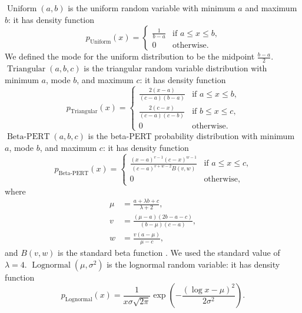 \documentclass[11pt]{article}
\DeclareMathOperator{\Uniform}{Uniform}
\DeclareMathOperator{\Triangular}{Triangular}
\DeclareMathOperator{\Lognormal}{Lognormal}
\DeclareMathOperator{\BetaPERT}{Beta-PERT}
\begin{document}
$\Uniform(a, b)$ is the uniform random variable with minimum $a$
and maximum $b$: it has density function
\begin{equation}
  \label{uniform}
  p_{\Uniform}(x) =
  \begin{cases}
    \frac{1}{b - a} & \text{if $a \leq x \leq b$,}
    \\
    0 & \text{otherwise.}
  \end{cases}
\end{equation}
We defined the mode for the uniform distribution to be the midpoint
$\frac{b - a}{2}$.
%
$\Triangular(a, b, c)$ is the triangular random variable
distribution with minimum $a$, mode $b$, and maximum $c$: it has
density function
\begin{equation}
  \label{triangular}
  p_{\Triangular}(x) =
  \begin{cases}
    \frac{2 (x - a)}{(c - a)(b - a)} & \text{if $a \leq x \leq b$,}
    \\
    \frac{2 (c - x)}{(c - a)(c - b)} & \text{if $b \leq x \leq c$,}
    \\
    0 & \text{otherwise.}
  \end{cases}
\end{equation}
$\BetaPERT(a, b, c)$ is the beta-PERT probability distribution
\cite{malcom1959} with minimum $a$, mode $b$, and maximum $c$: it has
density function
\begin{equation}
  \label{betaPERT}
  p_{\BetaPERT}(x) =
  \begin{cases}
    \frac{(x - a)^{v - 1} (c - x)^{w - 1}}{(c - a)^{v + w - 2} B(v, w)}
    & \text{if $a \leq x \leq c$,}
    \\
    0 & \text{otherwise,}
  \end{cases}
\end{equation}
where
\begin{equation}
  \begin{split}
    \mu &= \frac{a + \lambda b + c}{\lambda + 2},
    \\
    v &= \frac{(\mu - a)(2 b - a - c)}{(b - \mu) (c - a)},
    \\
    w &= \frac{v (a - \mu)}{\mu - c},
  \end{split}
\end{equation}
and $B(v, w)$ is the standard beta function \cite[\S 6.2]{davis1972}.
We used the standard value of $\lambda = 4$.
%
$\Lognormal(\mu, \sigma^2)$ is the lognormal random variable: it has
density function
\begin{equation}
  p_{\Lognormal}(x) = \frac{1}{x \sigma \sqrt{2 \pi}}
  \exp\left(- \frac{\left(\log x - \mu\right)^2}{2 \sigma^2}\right).
\end{equation}
\end{document}
